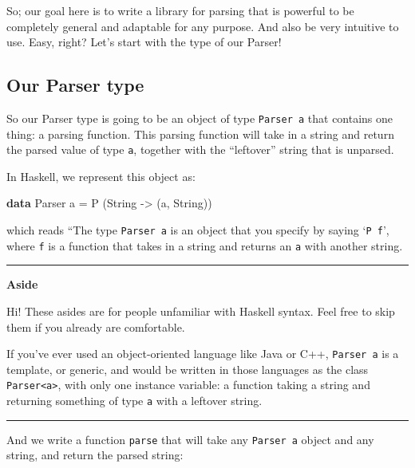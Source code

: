 \documentclass[]{article}
\newenvironment{Shaded}{}{}
\newcommand{\DataTypeTok}[1]{\textcolor[rgb]{0.56,0.13,0.00}{#1}}
\newcommand{\KeywordTok}[1]{\textcolor[rgb]{0.00,0.44,0.13}{\textbf{#1}}}
\newcommand{\NormalTok}[1]{#1}
\newcommand{\OtherTok}[1]{\textcolor[rgb]{0.00,0.44,0.13}{#1}}
\begin{document}
So; our goal here is to write a library for parsing that is powerful to be
completely general and adaptable for any purpose. And also be very intuitive to
use. Easy, right? Let's start with the type of our Parser!

\subsection{Our Parser type}\label{our-parser-type-1}

So our Parser type is going to be an object of type \texttt{Parser\ a} that
contains one thing: a parsing function. This parsing function will take in a
string and return the parsed value of type \texttt{a}, together with the
``leftover'' string that is unparsed.

In Haskell, we represent this object as:

\begin{Shaded}
\begin{Highlighting}[]
\KeywordTok{data} \DataTypeTok{Parser}\NormalTok{ a }\OtherTok{=} \DataTypeTok{P}\NormalTok{ (}\DataTypeTok{String} \OtherTok{{-}\textgreater{}}\NormalTok{ (a, }\DataTypeTok{String}\NormalTok{))}
\end{Highlighting}
\end{Shaded}

which reads ``The type \texttt{Parser\ a} is an object that you specify by
saying `\texttt{P\ f}', where \texttt{f} is a function that takes in a string
and returns an \texttt{a} with another string.

\begin{center}\rule{0.5\linewidth}{0.5pt}\end{center}

\textbf{Aside}

Hi! These asides are for people unfamiliar with Haskell syntax. Feel free to
skip them if you already are comfortable.

If you've ever used an object-oriented language like Java or C++,
\texttt{Parser\ a} is a template, or generic, and would be written in those
languages as the class \texttt{Parser\textless{}a\textgreater{}}, with only one
instance variable: a function taking a string and returning something of type
\texttt{a} with a leftover string.

\begin{center}\rule{0.5\linewidth}{0.5pt}\end{center}

And we write a function \texttt{parse} that will take any \texttt{Parser\ a}
object and any string, and return the parsed string:
\end{document}
